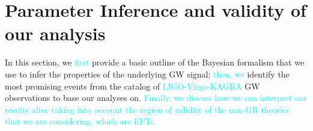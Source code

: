 \documentclass[twocolumn,
               prd,
               aps,
               superscriptaddress,
               tightenlines,
               nofootinbib,
               eqsecnum,
               amsfonts,
               amsmath,
               longbibliography]{revtex4-1}
\newcommand{\ab}[1]{{\textcolor{cyan}{{#1}} }}
\begin{document}

\section{Parameter Inference and validity of our analysis}
\label{sec:pe}
% 

In this section, we \ab{first} provide a basic outline of the Bayesian formalism that we use to
infer the properties of the underlying GW signal; \ab{then, we} identify the most promising
events from the catalog of \ab{LIGO-Virgo-KAGRA} GW observations to base our analyses on. \ab{Finally, 
we discuss how we can interpret our results after taking into account the region of validity of 
the non-GR theories that we are considering, which are EFTs.}
\end{document}
